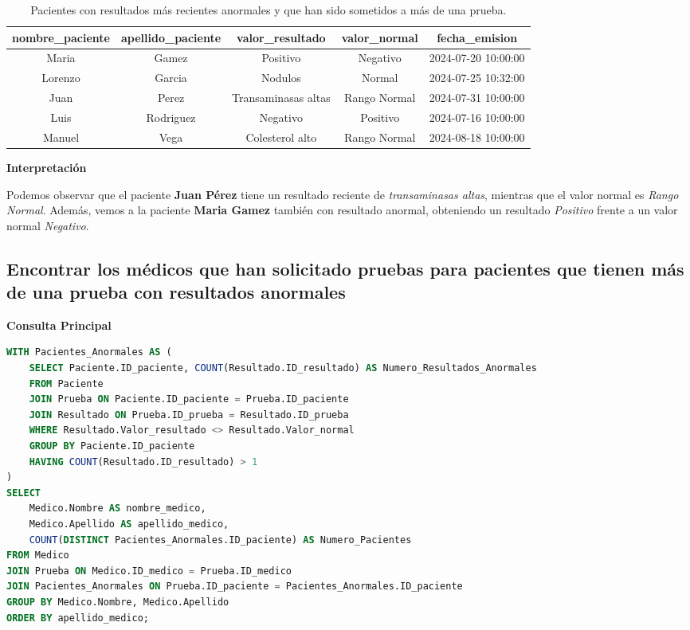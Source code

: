 \documentclass[spanish]{article}
\begin{document}
\begin{table}[h!]
\centering
\begin{tabular}{|c|c|c|c|c|}
\hline
\textbf{nombre\_paciente} & \textbf{apellido\_paciente} & \textbf{valor\_resultado} & \textbf{valor\_normal} & \textbf{fecha\_emision} \\
\hline
Maria & Gamez & Positivo & Negativo & 2024-07-20 10:00:00 \\ \hline
Lorenzo & Garcia & Nodulos & Normal & 2024-07-25 10:32:00 \\ \hline
Juan & Perez & Transaminasas altas & Rango Normal & 2024-07-31 10:00:00 \\ \hline
Luis & Rodriguez & Negativo & Positivo & 2024-07-16 10:00:00 \\ \hline
Manuel & Vega & Colesterol alto & Rango Normal & 2024-08-18 10:00:00 \\ \hline
\end{tabular}
\caption{Pacientes con resultados más recientes anormales y que han sido sometidos a más de una prueba.}
\label{tab:historial_prueba}
\end{table}

\textbf{Interpretación}

 Podemos observar que el paciente \textbf{Juan Pérez} tiene un resultado reciente de \textit{transaminasas altas}, mientras que el valor normal es \textit{Rango Normal}. Además, vemos a la paciente \textbf{Maria Gamez} también con resultado anormal, obteniendo un resultado \textit{Positivo} frente a un valor normal \textit{Negativo}.


\subsection{Encontrar los médicos que han solicitado pruebas para pacientes que tienen más de una prueba con resultados anormales}

\textbf{Consulta Principal}
\begin{lstlisting}[language=SQL]
WITH Pacientes_Anormales AS (
    SELECT Paciente.ID_paciente, COUNT(Resultado.ID_resultado) AS Numero_Resultados_Anormales
    FROM Paciente
    JOIN Prueba ON Paciente.ID_paciente = Prueba.ID_paciente
    JOIN Resultado ON Prueba.ID_prueba = Resultado.ID_prueba
    WHERE Resultado.Valor_resultado <> Resultado.Valor_normal
    GROUP BY Paciente.ID_paciente
    HAVING COUNT(Resultado.ID_resultado) > 1
)
SELECT 
    Medico.Nombre AS nombre_medico, 
    Medico.Apellido AS apellido_medico, 
    COUNT(DISTINCT Pacientes_Anormales.ID_paciente) AS Numero_Pacientes
FROM Medico
JOIN Prueba ON Medico.ID_medico = Prueba.ID_medico
JOIN Pacientes_Anormales ON Prueba.ID_paciente = Pacientes_Anormales.ID_paciente
GROUP BY Medico.Nombre, Medico.Apellido
ORDER BY apellido_medico;
\end{lstlisting}
\end{document}
